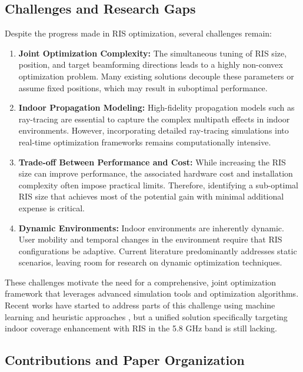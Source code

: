 \documentclass{IEEEoj}
\begin{document}
\subsection{Challenges and Research Gaps}

Despite the progress made in RIS optimization, several challenges remain:
\begin{enumerate}
	\item \textbf{Joint Optimization Complexity:} The simultaneous tuning of RIS size, position, and target beamforming directions leads to a highly non-convex optimization problem. Many existing solutions decouple these parameters or assume fixed positions, which may result in suboptimal performance.
	\item \textbf{Indoor Propagation Modeling:} High-fidelity propagation models such as ray-tracing are essential to capture the complex multipath effects in indoor environments. However, incorporating detailed ray-tracing simulations into real-time optimization frameworks remains computationally intensive.
	\item \textbf{Trade-off Between Performance and Cost:} While increasing the RIS size can improve performance, the associated hardware cost and installation complexity often impose practical limits. Therefore, identifying a sub-optimal RIS size that achieves most of the potential gain with minimal additional expense is critical.
	\item \textbf{Dynamic Environments:} Indoor environments are inherently dynamic. User mobility and temporal changes in the environment require that RIS configurations be adaptive. Current literature predominantly addresses static scenarios, leaving room for research on dynamic optimization techniques.
\end{enumerate}

These challenges motivate the need for a comprehensive, joint optimization framework that leverages advanced simulation tools and optimization algorithms. Recent works have started to address parts of this challenge using machine learning and heuristic approaches \cite{turn0academia10}, but a unified solution specifically targeting indoor coverage enhancement with RIS in the 5.8 GHz band is still lacking.

\subsection{Contributions and Paper Organization}
\end{document}
